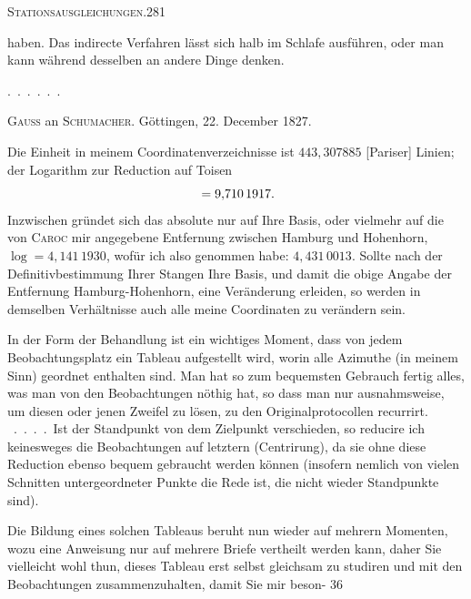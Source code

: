 \clearpage
\noindent\mbox{}\hfill\textsc{Stationsausgleichungen.}\hfill281\par\medskip
\noindent haben. Das indirecte Verfahren lässt sich halb im Schlafe ausführen, oder man kann während desselben an andere Dinge denken.

\noindent\hspace*{1.5em}.\ .\ .\ .\ .\ .

\vspace{2cm}
\begin{center}
\textsc{Gauss} an \textsc{Schumacher}. Göttingen, 22. December 1827.
\end{center}
Die Einheit in meinem Coordinatenverzeichnisse ist $443{,}307885$ [Pariser] Linien; der Logarithm zur Reduction auf Toisen
\[
\llap{\raisebox{1.2ex}{\text{\tiny.}}\hspace{4cm}}=9{,}710\,1917.
\]
Inzwischen gründet sich das absolute nur auf Ihre Basis, oder vielmehr auf die von \textsc{Caroc} mir angegebene Entfernung zwischen Hamburg und Hohenhorn, $\log=4{,}141\,1930$, wofür ich also genommen habe: $4{,}431\,0013$. Sollte nach der Definitivbestimmung Ihrer Stangen Ihre Basis, und damit die obige Angabe der Entfernung Hamburg-Hohenhorn, eine Veränderung erleiden, so werden in demselben Verhältnisse auch alle meine Coordinaten zu verändern sein.

In der Form der Behandlung ist ein wichtiges Moment, dass von jedem Beobachtungsplatz ein Tableau aufgestellt wird, worin alle Azimuthe (in meinem Sinn) geordnet enthalten sind. Man hat so zum bequemsten Gebrauch fertig alles, was man von den Beobachtungen nöthig hat, so dass man nur ausnahmsweise, um diesen oder jenen Zweifel zu lösen, zu den Originalprotocollen recurrirt. \ .\ .\ .\ .\ Ist der Standpunkt von dem Zielpunkt verschieden, so reducire ich keinesweges die Beobachtungen auf letztern (Centrirung), da sie ohne diese Reduction ebenso bequem gebraucht werden können (insofern nemlich von vielen Schnitten untergeordneter Punkte die Rede ist, die nicht wieder Standpunkte sind).

\noindent\hfill\raisebox{.3ex}{\textbullet}\hspace*{1.2cm}\par
Die Bildung eines solchen Tableaus beruht nun wieder auf mehrern Momenten, wozu eine Anweisung nur auf mehrere Briefe vertheilt werden kann, daher Sie vielleicht wohl thun, dieses Tableau erst selbst gleichsam zu studiren und mit den Beobachtungen zusammenzuhalten, damit Sie mir beson-
\vfill
{}\hfill36
\endgroup

